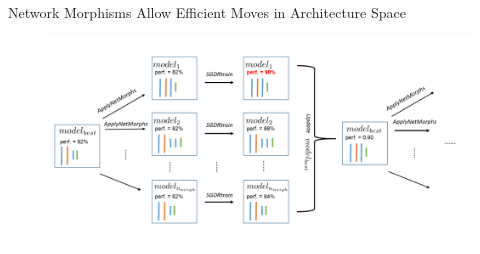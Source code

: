 \begin{frame}{Network Morphisms Allow Efficient Moves in Architecture Space}

    \begin{figure}[t]
        \begin{centering}
            \includegraphics[scale=0.3]{images_lec7/NASH.png}
        \end{centering}
    \end{figure}



\end{frame}

